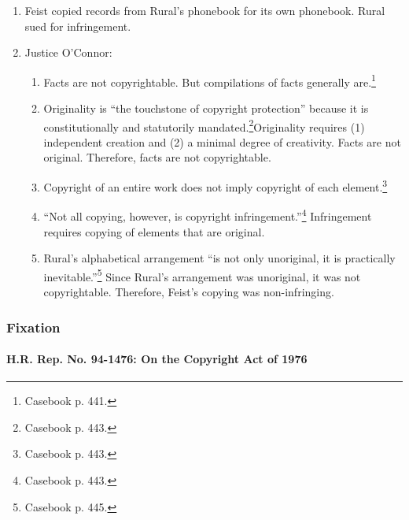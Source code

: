 \begin{enumerate}
    \item Feist copied records from Rural's phonebook for its own phonebook. 
    Rural sued for infringement.
    \item Justice O'Connor:
    \begin{enumerate}
        \item Facts are not copyrightable. But compilations of facts generally 
        are.\footnote{Casebook p. 441.}
        \item Originality is ``the touchstone of copyright 
        protection'' because it is constitutionally and statutorily 
        mandated.\footnote{Casebook p. 443.}Originality requires (1) 
        independent creation and (2) a minimal degree of creativity.  
        Facts are not original. Therefore, facts are not copyrightable.
        \item Copyright of an entire work does not imply copyright of each 
        element.\footnote{Casebook p. 443.}
        \item ``Not all copying, however, is copyright 
        infringement.''\footnote{Casebook p. 443.} Infringement requires 
        copying of elements that are original. 
        \item Rural's alphabetical arrangement ``is not only unoriginal, it is 
        practically inevitable.''\footnote{Casebook p. 445.} Since Rural's 
        arrangement was unoriginal, it was not copyrightable. Therefore, 
        Feist's copying was non-infringing.
    \end{enumerate}
\end{enumerate}

\subsubsection{Fixation}

\paragraph{H.R. Rep. No. 94-1476: On the Copyright Act of 1976}

